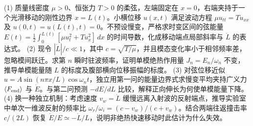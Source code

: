 (1) 质量线密度 \(\mu>0\)、恒张力 \(T>0\) 的柔弦，左端固定在 \(x=0\)，右端夹持于一个光滑移动的刚性边界 \(x=L(t)\)。小横位移 \(u(x,t)\) 满足波动方程 \(\mu u_{tt}=Tu_{xx}\) 及 \(u(0,t)=u(L(t),t)=0\)。不预设慢变，严格求时变区间的弦能量
\(E(t)=\frac12\int_0^{L(t)}[\mu u_t^2+Tu_x^2]\,dx\) 的时间导数，化成移动端点局部斜率与 \(\dot L\) 的表达式。
(2) 现令 \(|\dot L|/c\ll1\)，其中 \(c=\sqrt{T/\mu}\)，并且模态变化率小于相邻频率差，忽略模间跃迁。求第 \(n\) 瞬时驻波频率，证明单模绝热作用量 \(J_n=E_n/\omega_n\) 不变，推导单模能量随 \(L\) 的标度及腹部横向位移振幅的标度。
(3) 对弦位移近似 \(u=A\sin(n\pi x/L)\cos\omega_nt\)，独立用第一问的能量边界式求慢变平均夹持广义力 \(\langle F_{\rm end}\rangle\) 与 \(\dot E\)。与第二问预测 \(-dE/dL\) 比较，解释正向伸长为何使单模能量下降。
(4) 换一种独立机制：考虑速度 \(v_w=\dot L\) 缓慢远离入射波的反射端点，推导实验室中单次一维波反射的频率比 \(\omega_r/\omega_i=(c-v_w)/(c+v_w)\)。结合两端往返撞击率 \(c/(2L)\) 恢复 \(\dot E/E\simeq-\dot L/L\)，说明非绝热快速移动时此估计为什么失效。
